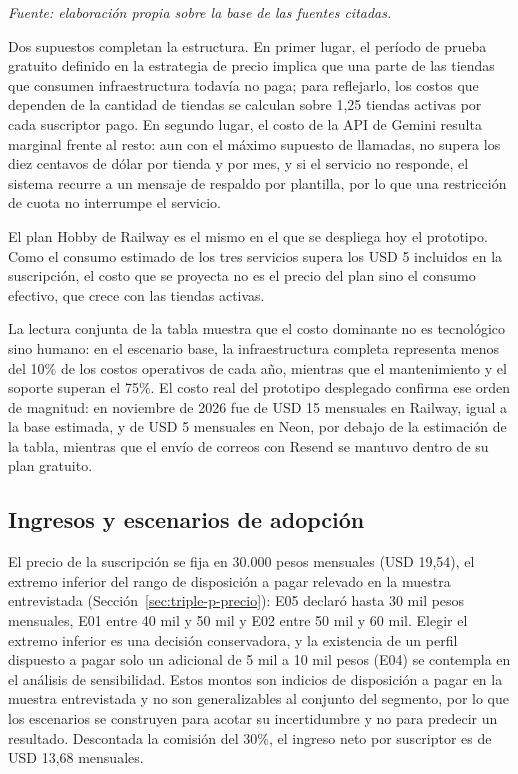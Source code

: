 \begin{table}[!htbp]
\smallskip
\noindent\textit{Fuente: elaboración propia sobre la base de las fuentes citadas.}
\end{table}

Dos supuestos completan la estructura. En primer lugar, el período de prueba gratuito definido en la estrategia de precio implica que una parte de las tiendas que consumen infraestructura todavía no paga; para reflejarlo, los costos que dependen de la cantidad de tiendas se calculan sobre 1,25 tiendas activas por cada suscriptor pago. En segundo lugar, el costo de la API de Gemini resulta marginal frente al resto: aun con el máximo supuesto de llamadas, no supera los diez centavos de dólar por tienda y por mes, y si el servicio no responde, el sistema recurre a un mensaje de respaldo por plantilla, por lo que una restricción de cuota no interrumpe el servicio.

El plan Hobby de Railway es el mismo en el que se despliega hoy el prototipo. Como el consumo estimado de los tres servicios supera los USD 5 incluidos en la suscripción, el costo que se proyecta no es el precio del plan sino el consumo efectivo, que crece con las tiendas activas.

La lectura conjunta de la tabla muestra que el costo dominante no es tecnológico sino humano: en el escenario base, la infraestructura completa representa menos del 10\% de los costos operativos de cada año, mientras que el mantenimiento y el soporte superan el 75\%. El costo real del prototipo desplegado confirma ese orden de magnitud: en noviembre de 2026 fue de USD 15 mensuales en Railway, igual a la base estimada, y de USD 5 mensuales en Neon, por debajo de la estimación de la tabla, mientras que el envío de correos con Resend se mantuvo dentro de su plan gratuito.

\subsection{Ingresos y escenarios de adopción}
\label{sec:viabilidad-ingresos}

El precio de la suscripción se fija en 30.000 pesos mensuales (USD 19,54), el extremo inferior del rango de disposición a pagar relevado en la muestra entrevistada (Sección~\ref{sec:triple-p-precio}): E05 declaró hasta 30 mil pesos mensuales, E01 entre 40 mil y 50 mil y E02 entre 50 mil y 60 mil. Elegir el extremo inferior es una decisión conservadora, y la existencia de un perfil dispuesto a pagar solo un adicional de 5 mil a 10 mil pesos (E04) se contempla en el análisis de sensibilidad. Estos montos son indicios de disposición a pagar en la muestra entrevistada y no son generalizables al conjunto del segmento, por lo que los escenarios se construyen para acotar su incertidumbre y no para predecir un resultado. Descontada la comisión del 30\%, el ingreso neto por suscriptor es de USD 13,68 mensuales.

